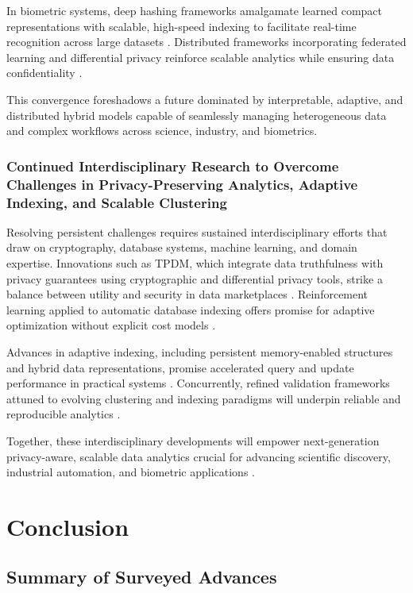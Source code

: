 \documentclass[sigconf]{acmart}
\begin{document}
In biometric systems, deep hashing frameworks amalgamate learned compact representations with scalable, high-speed indexing to facilitate real-time recognition across large datasets \cite{ref29}. Distributed frameworks incorporating federated learning and differential privacy reinforce scalable analytics while ensuring data confidentiality \cite{ref25}.

This convergence foreshadows a future dominated by interpretable, adaptive, and distributed hybrid models capable of seamlessly managing heterogeneous data and complex workflows across science, industry, and biometrics.

\subsubsection{Continued Interdisciplinary Research to Overcome Challenges in Privacy-Preserving Analytics, Adaptive Indexing, and Scalable Clustering}

Resolving persistent challenges requires sustained interdisciplinary efforts that draw on cryptography, database systems, machine learning, and domain expertise. Innovations such as TPDM, which integrate data truthfulness with privacy guarantees using cryptographic and differential privacy tools, strike a balance between utility and security in data marketplaces \cite{ref30}. Reinforcement learning applied to automatic database indexing offers promise for adaptive optimization without explicit cost models \cite{ref34}.

Advances in adaptive indexing, including persistent memory-enabled structures and hybrid data representations, promise accelerated query and update performance in practical systems \cite{ref32}. Concurrently, refined validation frameworks attuned to evolving clustering and indexing paradigms will underpin reliable and reproducible analytics \cite{ref24}.

Together, these interdisciplinary developments will empower next-generation privacy-aware, scalable data analytics crucial for advancing scientific discovery, industrial automation, and biometric applications \cite{ref1,ref35}.

\section{Conclusion}

\subsection{Summary of Surveyed Advances}
\end{document}
